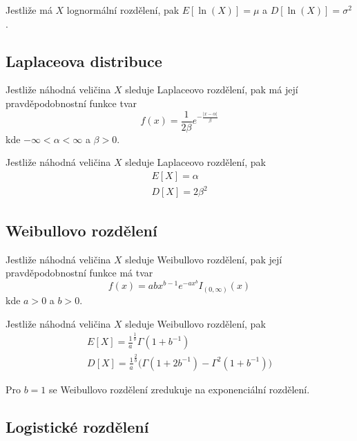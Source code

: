 Jestliže má $X$ lognormální rozdělení, pak $E[\ln(X)] = \mu$ a $D[\ln(X)] = \sigma^2$.

\subsection{Laplaceova distribuce}

\begin{definition}
Jestliže náhodná veličina $X$ sleduje Laplaceovo rozdělení, pak má její pravděpodobnostní funkce tvar
\begin{equation*}
f(x) = \frac{1}{2 \beta} e^{-\frac{|x - \alpha|}{\beta}}
\end{equation*}
kde $-\infty < \alpha < \infty$ a $\beta > 0$.
\end{definition}

\begin{theorem}
Jestliže náhodná veličina $X$ sleduje Laplaceovo rozdělení, pak
\begin{gather*}
E[X] = \alpha\\
D[X] = 2 \beta^2
\end{gather*}
\end{theorem}

\subsection{Weibullovo rozdělení}

\begin{definition}
Jestliže náhodná veličina $X$ sleduje Weibullovo rozdělení, pak její pravděpodobnostní funkce má tvar
\begin{equation*}
f(x) = abx^{b-1}e^{-ax^b}I_{(0, \infty)}(x)
\end{equation*}
kde $a > 0$ a $b > 0$.
\end{definition}

\begin{theorem}
Jestliže náhodná veličina $X$ sleduje Weibullovo rozdělení, pak
\begin{gather*}
E[X] = \frac{1}{a}^{\frac{1}{b}}\Gamma(1 + b^{-1})\\
D[X] = \frac{1}{a}^{\frac{2}{b}}\big(\Gamma(1 + 2 b^{-1}) - \Gamma^2(1 + b^{-1}) \big)
\end{gather*}
\end{theorem}

Pro $b = 1$ se Weibullovo rozdělení zredukuje na exponenciální rozdělení.

\subsection{Logistické rozdělení}

